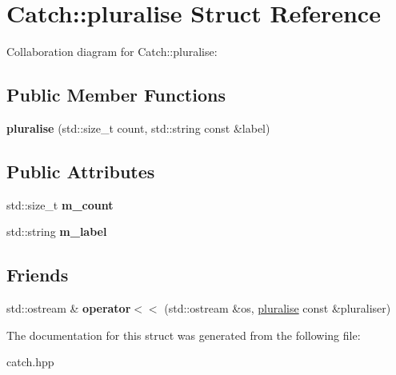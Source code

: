 \hypertarget{structCatch_1_1pluralise}{}\section{Catch\+:\+:pluralise Struct Reference}
\label{structCatch_1_1pluralise}


Collaboration diagram for Catch\+:\+:pluralise\+:
\subsection*{Public Member Functions}
\begin{DoxyCompactItemize}
\item 
\mbox{\label{structCatch_1_1pluralise_a5c55e22de2416cfe416edf715c6b9234}} 
{\bfseries pluralise} (std\+::size\+\_\+t count, std\+::string const \&label)
\end{DoxyCompactItemize}
\subsection*{Public Attributes}
\begin{DoxyCompactItemize}
\item 
\mbox{\label{structCatch_1_1pluralise_a4dce2fa13ec6f00fac09b2418265441e}} 
std\+::size\+\_\+t {\bfseries m\+\_\+count}
\item 
\mbox{\label{structCatch_1_1pluralise_a8849cbdd3f11ebe7747597c8644e8793}} 
std\+::string {\bfseries m\+\_\+label}
\end{DoxyCompactItemize}
\subsection*{Friends}
\begin{DoxyCompactItemize}
\item 
\mbox{\label{structCatch_1_1pluralise_aa7dac6b165514c1f85e0695d678fdef5}} 
std\+::ostream \& {\bfseries operator$<$$<$} (std\+::ostream \&os, \hyperlink{structCatch_1_1pluralise}{pluralise} const \&pluraliser)
\end{DoxyCompactItemize}


The documentation for this struct was generated from the following file\+:\begin{DoxyCompactItemize}
\item 
catch.\+hpp\end{DoxyCompactItemize}
